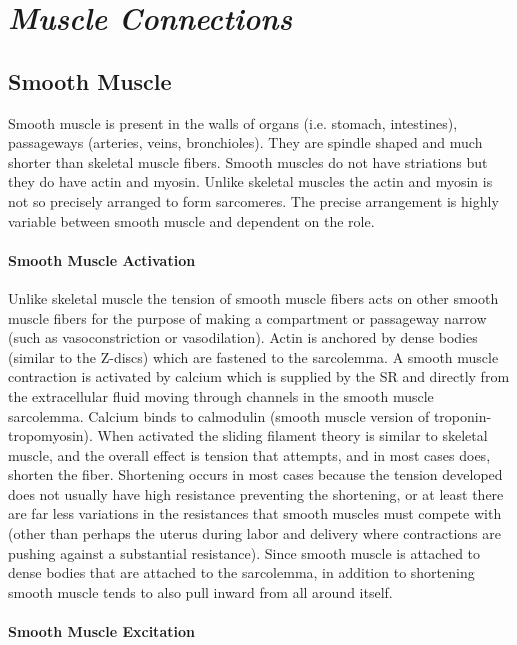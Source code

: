 \section{\textit{Muscle Connections}}

\subsection{Smooth Muscle}

Smooth muscle is present in the walls of organs (i.e. stomach, intestines), passageways (arteries, veins, bronchioles). They are spindle shaped and much shorter than skeletal muscle fibers. Smooth muscles do not have striations but they do have actin and myosin. Unlike skeletal muscles the actin and myosin is not so precisely arranged to form sarcomeres. The precise arrangement is highly variable between smooth muscle and dependent on the role. 

\paragraph{Smooth Muscle Activation}

Unlike skeletal muscle the tension of smooth muscle fibers acts on other smooth muscle fibers for the purpose of making a compartment or passageway narrow (such as vasoconstriction or vasodilation). Actin is anchored by dense bodies (similar to the Z-discs) which are fastened to the sarcolemma. A smooth muscle contraction is activated by calcium which is supplied by the SR and directly from the  extracellular fluid moving through channels in the smooth muscle sarcolemma. Calcium binds to calmodulin (smooth muscle version of troponin-tropomyosin). When activated the sliding filament theory is similar to skeletal muscle, and the overall effect is tension that attempts, and in most cases does, shorten the fiber. Shortening occurs in most cases because the tension developed does not usually have high resistance preventing the shortening, or at least there are far less variations in the resistances that smooth muscles must compete with (other than perhaps the uterus during labor and delivery where contractions are pushing against a substantial resistance). Since smooth muscle is attached to dense bodies that are attached to the sarcolemma, in addition to shortening smooth muscle tends to also pull inward from all around itself. 

\paragraph{Smooth Muscle Excitation}

